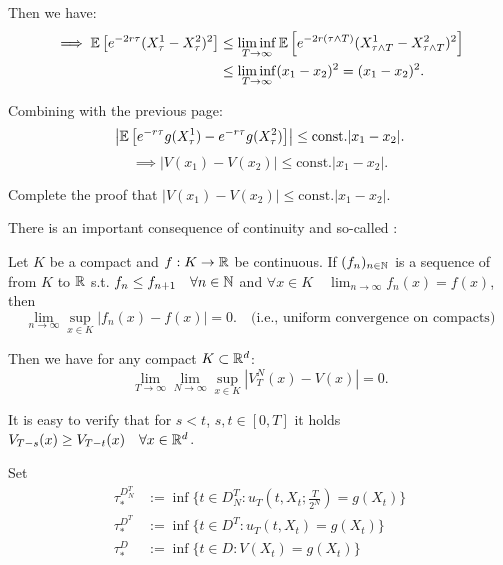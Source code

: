 Then we have:
\begin{align*}
    \implies \mathbb E \left[ e^{-2r\tau} (X_\tau^1 - X_\tau^2)^2 \right] &\leq \liminf_{T \to \infty} \mathbb E \left[ e^{-2r(\tau \wedge T)} (X_{\tau \wedge T}^1 - X_{\tau \wedge T}^2)^2 \right] \\
    &\leq \liminf_{T \to \infty} (x_1 - x_2)^2 = (x_1 - x_2)^2.
\end{align*}

Combining with the previous page:
\[ \left| \mathbb E \left[ e^{-r\tau} g(X_\tau^1) - e^{-r\tau} g(X_\tau^2) \right] \right| \leq \text{const.} |x_1 - x_2|. \]
\[ \implies |V(x_1) - V(x_2)| \leq \text{const.} |x_1 - x_2|. \]

\begin{homework}
    Complete the proof that $|V(x_1) - V(x_2)| \leq \text{const.} |x_1 - x_2|$.
\end{homework}

There is an important consequence of continuity and so-called :

\begin{lemma}
    Let $K$ be a compact and $f: K \to \mathbb R$ be continuous. If $(f_n)_{n \in \mathbb N}$ is a sequence of  from $K$ to $\mathbb R$ s.t. $f_n \leq f_{n+1} \quad \forall n \in \mathbb N$ and $\forall x \in K \quad \lim_{n \to \infty} f_n(x) = f(x)$, then
    \[ \lim_{n \to \infty} \sup_{x \in K} |f_n(x) - f(x)| = 0. \quad \text{(i.e., uniform convergence on compacts)} \]
\end{lemma}

Then we have for any compact $K \subset \mathbb R^d$:
\begin{equation*}
    \boxed{\lim_{T \to \infty} \lim_{N \to \infty} \sup_{x \in K} |V_T^N(x) - V(x)| = 0.}
\end{equation*}

\begin{homework}
    It is easy to verify that for $s < t$, $s, t \in [0, T]$ it holds $V_{T-s}(x) \geq V_{T-t}(x) \quad \forall x \in \mathbb R^d$.
\end{homework}

Set
\begin{align*}
    \tau_*^{D_N^T} &:= \inf \{ t \in D_N^T : u_T(t, X_t; \tfrac{T}{2^N}) = g(X_t) \} \\
    \tau_*^{D^T} &:= \inf \{ t \in D^T : u_T(t, X_t) = g(X_t) \} \\
    \tau_*^D &:= \inf \{ t \in D : V(X_t) = g(X_t) \}
\end{align*}

